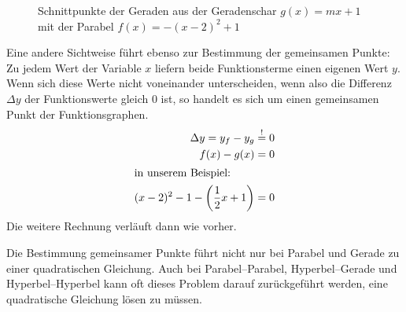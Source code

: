 \begin{bsp}
\begin{figure}
\begin{center}
 \end{center}
\caption{Schnittpunkte der Geraden aus der Geradenschar \(g(x)=mx+1\) mit der Parabel \(f(x)=-(x-2)^2+1\)}
\end{figure}

\end{bsp}


\begin{regel}
 Eine andere Sichtweise führt ebenso zur Bestimmung der gemeinsamen Punkte: Zu jedem Wert der Variable \(x\) liefern beide Funktionsterme einen eigenen Wert \(y\). Wenn sich diese Werte nicht voneinander unterscheiden, wenn also die Differenz \(\Delta y\) der Funktionswerte gleich 0 ist, so handelt es sich um einen gemeinsamen Punkt der Funktionsgraphen.
 \begin{align*}
  \Delta y = y_f -y_g &\stackrel{!}{=} 0\\
  f(x)-g(x) &= 0 \\
  \intertext{in unserem Beispiel:}
  (x-2)^2-1-\left(\frac{1}{2}x+1\right) &=0
 \end{align*}
 Die weitere Rechnung verläuft dann wie vorher.
\end{regel}

Die Bestimmung gemeinsamer Punkte führt nicht nur bei Parabel und Gerade zu einer quadratischen Gleichung. Auch bei Parabel--Parabel, Hyperbel--Gerade und Hyperbel--Hyperbel kann oft dieses Problem darauf zurückgeführt werden, eine quadratische Gleichung lösen zu müssen.

